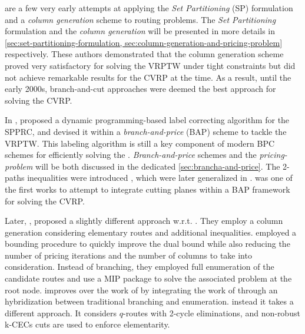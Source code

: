 \Textcite{desrosiers1984, agarwal1989setpartitioningbased}
are a few very early attempts at applying the \textit{Set Partitioning} (SP) formulation
and a \textit{column generation} scheme to routing problems.
The \textit{Set Partitioning} formulation and the \textit{column generation}
will be  presented in more details in \cref{sec:set-partitioning-formulation, sec:column-generation-and-pricing-problem}
respectively.
These authors demonstrated that the column generation scheme proved very satisfactory
for solving the VRPTW under tight constraints
but did not achieve remarkable results for the CVRP at the time.
As a result, until the early 2000s,
branch-and-cut approaches were deemed the best approach for solving the CVRP.

In \citeyear{desrochers1992}, \citeauthor{desrochers1992}
proposed a dynamic programming-based label correcting algorithm for the SPPRC,
and devised it within a \textit{branch-and-price} (BAP) scheme to tackle the VRPTW.
This labeling algorithm is still a key component of modern BPC schemes
for efficiently solving the .
\textit{Branch-and-price} schemes and the \textit{pricing-problem}
will be both discussed in the dedicated \cref{sec:brancha-and-price}.
The 2-paths inequalities were introduced \textcite{kohl1999},
which were later generalized in \textcite{desaulniers2008}.
\Textcite{kohl1999} was one of the first works to attempt
to integrate cutting planes within a BAP framework for solving the CVRP.


Later, \textcite{baldacci2008}, proposed a slightly different approach w.r.t. \textcite{fukasawa2006}.
They employ a column generation considering elementary routes and additional inequalities.
\citeauthor{baldacci2008} employed a bounding procedure to quickly
improve the dual bound while also reducing the number
of pricing iterations and the number of columns to take into consideration.
Instead of branching, they employed full enumeration of the candidate
routes and use a MIP package to solve the associated problem at the root node.
\textcite{pessoa2008} improves over the work of \textcite{fukasawa2006}
by integrating the work of \textcite{baldacci2008}
through an hybridization between traditional branching and enumeration.
\textcite{contardo2011} instead it takes a different approach.
It considers $q$-routes with 2-cycle eliminations, and non-robust
k-CECs cuts are used to enforce elementarity.

